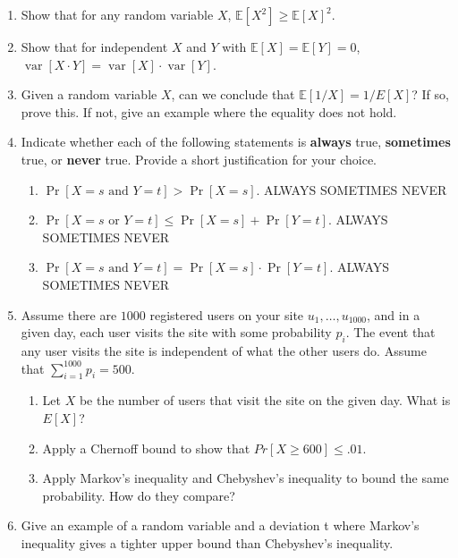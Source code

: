 \documentclass[10pt]{article}
\newcommand{\E}{\mathbb{E}}
\DeclareMathOperator*{\Var}{var}
\begin{document}
	\begin{enumerate}
		\item Show that for any  random variable ${X}$, $\E[{X}^2] \ge \E[{X}]^2$.
		\item Show that for independent ${X}$ and ${Y}$ with $\E[{X}] = \E[{Y}] = 0$, $\Var[{X} \cdot {Y}] = \Var[X] \cdot \Var[Y]$. 
		\item Given a random variable $X$, can we conclude that $\E[1/X] = 1/E[X]$? If so, prove this. If not, give an example where the equality does not hold.
		\item Indicate whether each of the following statements is \textbf{always} true, \textbf{sometimes} true, or \textbf{never} true. Provide a short justification for your choice. 
		\begin{enumerate}[label=(\alph*)]
			\item $\Pr[{X} = s \text{ and } {Y} = t] > \Pr[{X} = s]$. \hspace{1em}ALWAYS\hspace{1em} SOMETIMES\hspace{1em} NEVER
			\item $\Pr[{X} = s \text{ or }  {Y} = t] \le \Pr[{X} = s] + \Pr[{Y} = t]$. \hspace{1em}ALWAYS \hspace{1em} SOMETIMES\hspace{1em} NEVER
			\item $\Pr[{X} = s \text{ and } {Y} = t] = \Pr[{X} = s] \cdot \Pr[{Y} = t]$. \hspace{1em}ALWAYS\hspace{1em} SOMETIMES \hspace{1em} NEVER
		\end{enumerate}
		\item Assume there are $1000$ registered users on your site $u_1, \ldots, u_{1000}$, and in a given day, each user
		visits the site with some probability $p_i$. The event that any user visits the site is independent of what the other users do. Assume that $\sum_{i=1}^{1000} p_i = 500$. 
		\begin{enumerate}
			\item  Let $X$ be the number of users that visit the site on the given day. What is $E[X]$?
			\item Apply a Chernoff bound to show that $Pr[X \geq 600] \leq .01$.
			\item Apply Markov’s inequality and Chebyshev’s inequality to bound the same probability.
			How do they compare?
		\end{enumerate}
		\item Give an example of a random variable and a deviation t where Markov’s inequality gives a	tighter upper bound than Chebyshev’s inequality.
	\end{enumerate}
	
\end{document}
